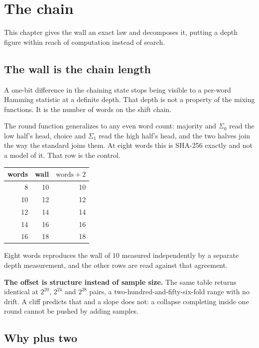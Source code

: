 \chapter{The chain}

This chapter gives the wall an exact law and decomposes it, putting a depth figure within reach of computation instead of search.

\section{The wall is the chain length}

A one-bit difference in the chaining state stops being visible to a per-word Hamming statistic at a definite depth. That depth is not a property of the mixing functions. It is the number of words on the shift chain.

The round function generalizes to any even word count: majority and \(\Sigma_0\) read the low half's head, choice and \(\Sigma_1\) read the high half's head, and the two halves join the way the standard joins them. At eight words this is SHA-256 exactly and not a model of it. That row is the control.

\begin{center}
\begin{tabular}{rrr}
\toprule
words & wall & \(\text{words} + 2\) \\
\midrule
8 & 10 & 10 \\
10 & 12 & 12 \\
12 & 14 & 14 \\
14 & 16 & 16 \\
16 & 18 & 18 \\
\bottomrule
\end{tabular}
\end{center}

Eight words reproduces the wall of \(10\) measured independently by a separate depth measurement, and the other rows are read against that agreement.

\textbf{The offset is structure instead of sample size.} The same table returns identical at \(2^{20}\), \(2^{24}\) and \(2^{28}\) pairs, a two-hundred-and-fifty-six-fold range with no drift. A cliff predicts that and a slope does not: a collapse completing inside one round cannot be pushed by adding samples.

\section{Why plus two}

